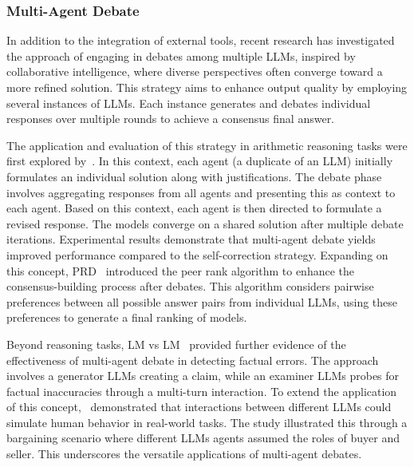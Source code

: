 \documentclass[12pt]{extarticle}
\begin{document}
\subsubsection{Multi-Agent Debate}
In addition to the integration of external tools, recent research has investigated the approach of engaging in debates among multiple LLMs, inspired by collaborative intelligence, where diverse perspectives often converge toward a more refined solution. This strategy aims to enhance output quality by employing several instances of LLMs. Each instance generates and debates individual responses over multiple rounds to achieve a consensus final answer.

The application and evaluation of this strategy in arithmetic reasoning tasks were first explored by~\cite{du2023improving}. In this context, each agent (a duplicate of an LLM) initially formulates an individual solution along with justifications. The debate phase involves aggregating responses from all agents and presenting this as context to each agent. Based on this context, each agent is then directed to formulate a revised response. The models converge on a shared solution after multiple debate iterations. Experimental results demonstrate that multi-agent debate yields improved performance compared to the self-correction strategy. Expanding on this concept, PRD~\cite{li2023prd} introduced the peer rank algorithm to enhance the consensus-building process after debates. This algorithm considers pairwise preferences between all possible answer pairs from individual LLMs, using these preferences to generate a final ranking of models.

Beyond reasoning tasks, LM vs LM~\cite{cohen2023lm} provided further evidence of the effectiveness of multi-agent debate in detecting factual errors. The approach involves a generator LLMs creating a claim, while an examiner LLMs probes for factual inaccuracies through a multi-turn interaction. To extend the application of this concept,~\cite{fu2023improving} demonstrated that interactions between different LLMs could simulate human behavior in real-world tasks. The study illustrated this through a bargaining scenario where different LLMs agents assumed the roles of buyer and seller. This underscores the versatile applications of multi-agent debates.

\newpage


\end{document}
